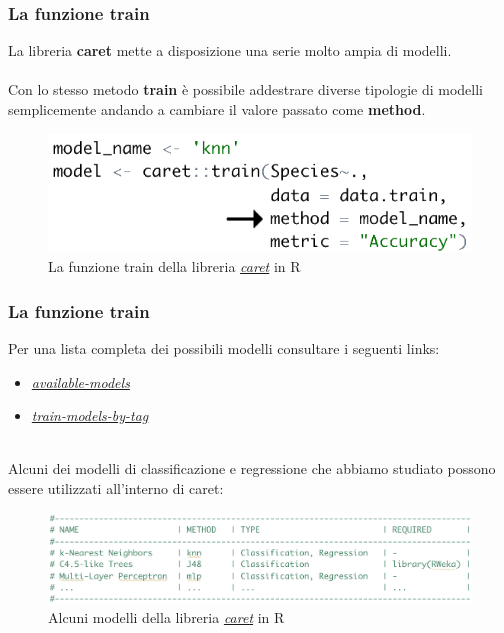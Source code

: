 \begin{frame}
	
	\frametitle{La funzione \textbf{train}}
	
	
	La libreria \textbf{caret} mette a disposizione una serie molto ampia di modelli.\\\\
	Con lo stesso metodo \textbf{train} è possibile addestrare diverse tipologie di modelli semplicemente andando a cambiare il valore passato come \textbf{method}.\\
	
	\begin{figure}[!htbp]
		\centering
		\includegraphics[width=0.75\linewidth]{images/supervised/coding/caret_train_2.png}
		\caption{La funzione train della libreria \href{https://github.com/topepo/caret}{\textit{caret}} in R}
	\end{figure}

\end{frame}


\begin{frame}
	
	\frametitle{La funzione \textbf{train}}
	
	
	Per una lista completa dei possibili modelli consultare i seguenti links:
	\begin{itemize}
		\item \href{https://topepo.github.io/caret/available-models.html}{\textit{available-models}}
		\item \href{http://topepo.github.io/caret/train-models-by-tag.html}{\textit{train-models-by-tag}}
	\end{itemize}
	~\\
	Alcuni dei modelli di classificazione e regressione che abbiamo studiato possono essere utilizzati all'interno di caret:
	
	\begin{figure}[!htbp]
		\centering
		\includegraphics[width=1.0\linewidth]{images/supervised/coding/caret_models.png}
		\caption{Alcuni modelli della libreria \href{https://github.com/topepo/caret}{\textit{caret}} in R}
	\end{figure}

\end{frame}


